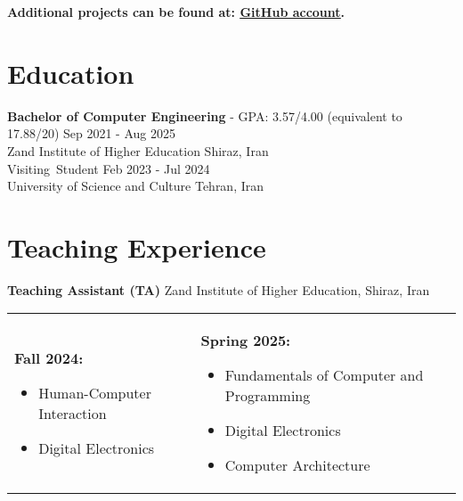 \documentclass[letter,10pt]{article}
\newcommand{\customsquare}{\raisebox{0.25ex}{\scalebox{0.45}{$\blacksquare$}}}
\begin{document}
\vspace{5pt}

\small \textbf{Additional projects can be found at: \href{https://github.com/karami-mehdi}{\underline{GitHub account}}.}

\newpage

\section*{Education}
\textbf{Bachelor of Computer Engineering} -  GPA: 3.57/4.00 (equivalent to 17.88/20) \hfill Sep 2021 - Aug 2025 \\
Zand Institute of Higher Education  \hfill Shiraz, Iran \\[5pt]
\mbox{Visiting Student\hspace{0.1mm}} \hfill Feb 2023 - Jul 2024 \\
University of Science and Culture \hfill Tehran, Iran

\section*{Teaching Experience}
\textbf{Teaching Assistant (TA)} \hfill Zand Institute of Higher Education, Shiraz, Iran \\ [5pt]
\begin{tabularx}{\textwidth}{@{}X X@{}}
    \customsquare\hspace{2mm}\textbf{Fall 2024:} 
    \begin{itemize}
        \item Human-Computer Interaction
        \item Digital Electronics
    \end{itemize}
    &
    \customsquare\hspace{2mm}\textbf{Spring 2025:} 
    \begin{itemize}
        \item Fundamentals of Computer and Programming
        \item Digital Electronics
        \item Computer Architecture
    \end{itemize}
\end{tabularx} \\ [-20pt]

\end{document}
